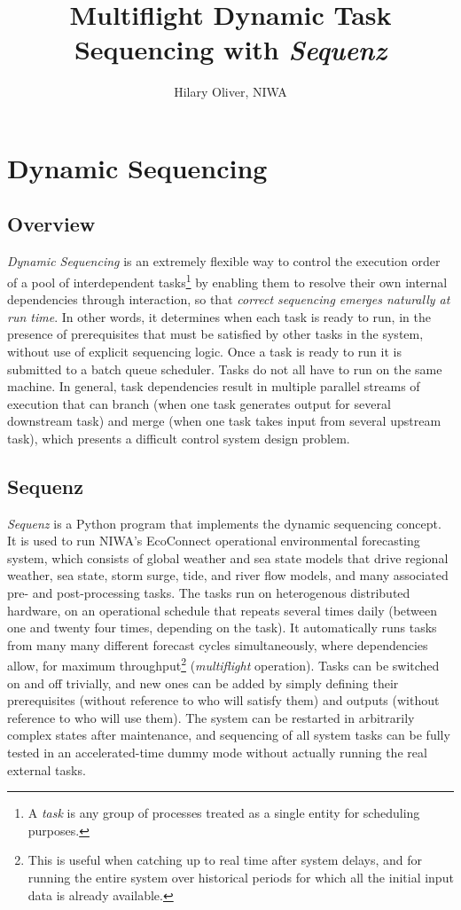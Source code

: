 \documentclass[11pt,a4paper]{article}
\title{Multiflight Dynamic Task Sequencing with {\em Sequenz}}
\author{Hilary Oliver, NIWA}
\begin{document}
\maketitle
\tableofcontents


\section{Dynamic Sequencing}

\subsection{Overview}

{\em Dynamic Sequencing} is an extremely flexible way to control the
execution order of a pool of interdependent tasks\footnote{A {\em task}
is any group of processes treated as a single entity for scheduling
purposes.} by enabling them to resolve their own internal dependencies
through interaction, so that {\em correct sequencing emerges naturally
at run time}. In other words, it determines when each task is ready to
run, in the presence of prerequisites that must be satisfied by other
tasks in the system, without use of explicit sequencing logic. Once a
task is ready to run it is submitted to a batch queue scheduler. Tasks
do not all have to run on the same machine.  In general, task
dependencies result in multiple parallel streams of execution that can
branch (when one task generates output for several downstream task) and
merge (when one task takes input from several upstream task), which
presents a difficult control system design problem.  


\subsection{Sequenz}

{\em Sequenz} is a Python program that implements the dynamic sequencing
concept. It is used to run NIWA's EcoConnect operational environmental
forecasting system, which consists of global weather and sea state
models that drive regional weather, sea state, storm surge, tide, and
river flow models, and many associated pre- and post-processing tasks.
The tasks run on heterogenous distributed hardware, on an operational
schedule that repeats several times daily (between one and twenty four
times, depending on the task).  It automatically runs tasks from many
many different forecast cycles simultaneously, where dependencies allow,
for maximum throughput\footnote{This is useful when catching up to real
time after system delays, and for running the entire system over
historical periods for which all the initial input data is already
available.} ({\em multiflight} operation). Tasks can be switched on and
off trivially, and new ones can be added by simply defining their
prerequisites (without reference to who will satisfy them) and outputs
(without reference to who will use them). The system can be restarted in
arbitrarily complex states after maintenance, and sequencing of all
system tasks can be fully tested in an accelerated-time dummy mode
without actually running the real external tasks. 
\end{document}
